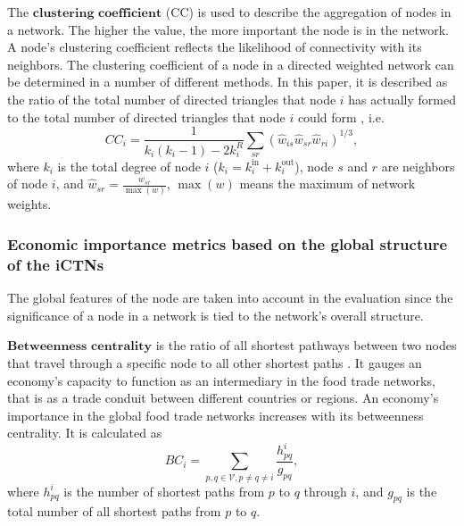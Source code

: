 \documentclass[preprint,3p,times,sort&compress]{elsarticle}
\begin{document}
The $\textbf{clustering coefficient}$ (CC) is used to describe the aggregation of nodes in a network. The higher the value, the more important the node is in the network. A node's clustering coefficient reflects the likelihood of connectivity with its neighbors. The clustering coefficient of a node in a directed weighted network can be determined in a number of different methods. In this paper, it is described as the ratio of the total number of directed triangles that node $i$ has actually formed to the total number of directed triangles that node $i$ could form \cite{Fagiolo-2007-PhysRevE}, i.e.
\begin{equation}
    CC_i=\frac{1}{k_i(k_i-1)-2k_i^{R}} \sum_{sr}(\hat{w}_{is} \hat{w}_{sr} \hat{w}_{ri})^{1/3},
    \label{Eq:DiGraph:Clustering:Node}
\end{equation}
where $k_i$ is the total degree of node $i$ ($k_i=k_i^{\mathrm{in}}+k_i^\mathrm{out}$), node $s$ and $r$ are neighbors of node $i$, and $\hat{w}_{sr}= \frac {w_{sr}}{\max(w)}$, $\max(w)$ means the maximum of network weights.

\subsubsection{Economic importance metrics based on the global structure of the iCTNs}



The global features of the node are taken into account in the evaluation since the significance of a node in a network is tied to the network's overall structure.



$\textbf{Betweenness centrality}$ is the ratio of all shortest pathways between two nodes that travel through a specific node to all other shortest paths \cite{Freeman-1977-Sociometry}. It gauges an economy's capacity to function as an intermediary in the food trade networks, that is as a trade conduit between different countries or regions. An economy's importance in the global food trade networks increases with its betweenness centrality. It is calculated as
\begin{equation}
BC_i=\sum_{p,q \in \mathscr{V}, p \neq q \neq i }\frac{h_{pq}^i}{g_{pq}},
\label{Eq:centrality:betweenness}
\end{equation}
where $h_{pq}^i$ is the number of shortest paths from $p$ to $q$ through $i$, and $g_{pq}$ is the total number of all shortest paths from $p$ to $q$.
\end{document}
